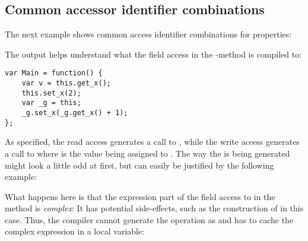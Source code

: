 \documentclass{haxe}
\begin{document}


\subsection{Common accessor identifier combinations}
\label{class-field-property-common-combinations}

The next example shows common access identifier combinations for properties:


The  output helps understand what the field access in the -method is compiled to:

\begin{lstlisting}
var Main = function() {
	var v = this.get_x();
	this.set_x(2);
	var _g = this;
	_g.set_x(_g.get_x() + 1);
};
\end{lstlisting}

As specified, the read access generates a call to , while the write access generates a call to  where  is the value being assigned to . The way the \expr{+=} is being generated might look a little odd at first, but can easily be justified by the following example:


What happens here is that the expression part of the field access to  in the  method is \emph{complex}: It has potential side-effects, such as the construction of  in this case. Thus, the compiler cannot generate the \expr{+=} operation as  and has to cache the complex expression in a local variable:
\end{document}
